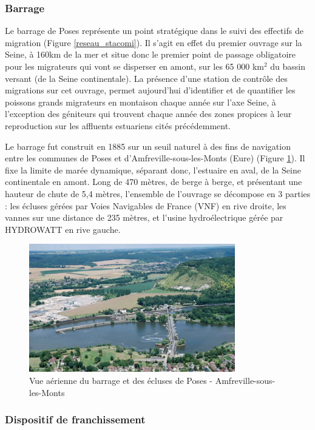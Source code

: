 \documentclass[11pt,titlepage,twoside]{article}\usepackage[]{graphicx}\usepackage[table]{xcolor}
\begin{document}
\subsubsection{Barrage}

Le barrage de Poses représente un point stratégique dans le suivi des effectifs de migration (Figure \ref{reseau_stacomi}). Il s'agit en effet du premier ouvrage sur la Seine, à 160km de la mer et situe donc le premier point de passage obligatoire pour les migrateurs qui vont se disperser en amont, sur les 65 000 km$^2$ du bassin versant (de la Seine continentale). La présence d'une station de contrôle des migrations sur cet ouvrage, permet aujourd'hui d'identifier et de quantifier les poissons grands migrateurs en montaison chaque année sur l'axe Seine, à l'exception des géniteurs qui trouvent chaque année des zones propices à leur reproduction sur les affluents estuariens cités précédemment.

Le barrage fut construit en 1885 sur un seuil naturel à des fins de navigation entre les communes de Poses et d'Amfreville-sous-les-Monts (Eure) (Figure \ref{vue_aerienne_poses}). Il fixe la limite de marée dynamique, séparant donc, l'estuaire en aval, de la Seine continentale en amont. Long de 470 mètres, de berge à berge, et présentant une hauteur de chute de 5,4 mètres, l'ensemble de l'ouvrage se décompose en 3 parties : les écluses gérées par Voies Navigables de France (VNF) en rive droite, les vannes sur une distance de 235 mètres, et l'usine hydroélectrique gérée par HYDROWATT en rive gauche.

\begin{figure}[htpb]
\centering
\includegraphics[width=0.8\textwidth]{vue_aerienne_poses}
\caption{Vue aérienne du barrage et des écluses de Poses - Amfreville-sous-les-Monts}
\label{vue_aerienne_poses}
\end{figure}

\subsubsection{Dispositif de franchissement}
\end{document}
